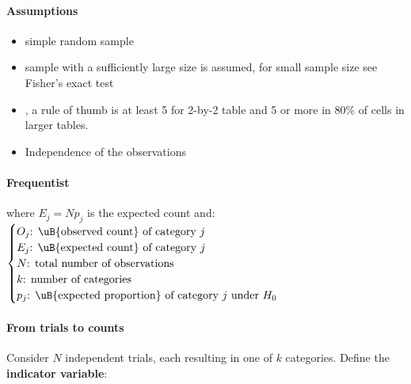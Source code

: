 \paragraph{Assumptions}
\begin{itemize}
    \item simple random sample
    \item sample with a sufficiently large size is assumed, for small sample size see Fisher's exact test
    \item {}, a rule of thumb is at least 5 for 2-by-2
        table and 5 or more in 80\% of cells in larger tables.
    \item Independence of the observations
\end{itemize}

\paragraph{Frequentist}
where $E_j = Np_j$ is the expected count and:
$\begin{cases}
    O_{j}\text{: \uB{observed count} of category }j \\
    E_{j}\text{: \uB{expected count} of category }j \\
    N\text{: total number of observations}\\
    k\text{: number of categories}\\
    p_{j}\text{: \uB{expected proportion} of category }j\text{ under } H_0
\end{cases}$

\paragraph{From trials to counts}
Consider $N$ independent trials, each resulting in one of $k$ categories.
Define the \textbf{indicator variable}:
\begin{center}
\end{center}


